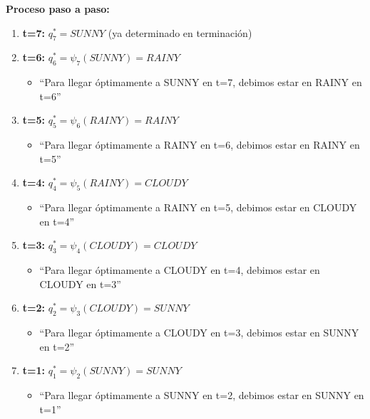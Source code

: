 \documentclass[
]{article}
\providecommand{\tightlist}{%
  \setlength{\itemsep}{0pt}\setlength{\parskip}{0pt}}
\begin{document}
\textbf{Proceso paso a paso:}

\begin{enumerate}
\def\labelenumi{\arabic{enumi}.}
\item
  \textbf{t=7:} \(q_7^* = SUNNY\) (ya determinado en terminación)
\item
  \textbf{t=6:} \(q_6^* = \psi_7(SUNNY) = RAINY\)

  \begin{itemize}
  \tightlist
  \item
    ``Para llegar óptimamente a SUNNY en t=7, debimos estar en RAINY en
    t=6''
  \end{itemize}
\item
  \textbf{t=5:} \(q_5^* = \psi_6(RAINY) = RAINY\)

  \begin{itemize}
  \tightlist
  \item
    ``Para llegar óptimamente a RAINY en t=6, debimos estar en RAINY en
    t=5''
  \end{itemize}
\item
  \textbf{t=4:} \(q_4^* = \psi_5(RAINY) = CLOUDY\)

  \begin{itemize}
  \tightlist
  \item
    ``Para llegar óptimamente a RAINY en t=5, debimos estar en CLOUDY en
    t=4''
  \end{itemize}
\item
  \textbf{t=3:} \(q_3^* = \psi_4(CLOUDY) = CLOUDY\)

  \begin{itemize}
  \tightlist
  \item
    ``Para llegar óptimamente a CLOUDY en t=4, debimos estar en CLOUDY
    en t=3''
  \end{itemize}
\item
  \textbf{t=2:} \(q_2^* = \psi_3(CLOUDY) = SUNNY\)

  \begin{itemize}
  \tightlist
  \item
    ``Para llegar óptimamente a CLOUDY en t=3, debimos estar en SUNNY en
    t=2''
  \end{itemize}
\item
  \textbf{t=1:} \(q_1^* = \psi_2(SUNNY) = SUNNY\)

  \begin{itemize}
  \tightlist
  \item
    ``Para llegar óptimamente a SUNNY en t=2, debimos estar en SUNNY en
    t=1''
  \end{itemize}
\end{enumerate}
\end{document}
